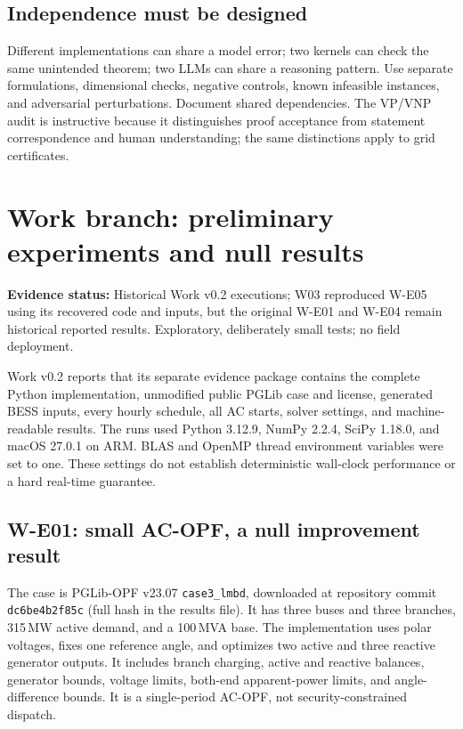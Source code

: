 \documentclass[11pt,letterpaper]{article}
\newcommand{\status}[1]{\textbf{Evidence status:} #1}
\begin{document}
\subsection{Independence must be designed}
Different implementations can share a model error; two kernels can check the same unintended theorem; two LLMs can share a reasoning pattern. Use separate formulations, dimensional checks, negative controls, known infeasible instances, and adversarial perturbations. Document shared dependencies. The VP/VNP audit is instructive because it distinguishes proof acceptance from statement correspondence and human understanding; the same distinctions apply to grid certificates.

\section{Work branch: preliminary experiments and null results}
\label{sec:results}
\status{Historical Work v0.2 executions; W03 reproduced W-E05 using its recovered code and inputs, but the original W-E01 and W-E04 remain historical reported results. Exploratory, deliberately small tests; no field deployment.}\cite{workbranch}

Work v0.2 reports that its separate evidence package contains the complete Python implementation, unmodified public PGLib case and license, generated BESS inputs, every hourly schedule, all AC starts, solver settings, and machine-readable results. The runs used Python 3.12.9, NumPy 2.2.4, SciPy 1.18.0, and macOS 27.0.1 on ARM. BLAS and OpenMP thread environment variables were set to one. These settings do not establish deterministic wall-clock performance or a hard real-time guarantee.

\subsection{W-E01: small AC-OPF, a null improvement result}
The case is PGLib-OPF v23.07 \texttt{case3\_lmbd}, downloaded at repository commit
\texttt{dc6be4b2f85c} (full hash in the results file). It has three buses and three branches, 315\,MW active demand, and a 100\,MVA base. The implementation uses polar voltages, fixes one reference angle, and optimizes two active and three reactive generator outputs. It includes branch charging, active and reactive balances, generator bounds, voltage limits, both-end apparent-power limits, and angle-difference bounds. It is a single-period AC-OPF, not security-constrained dispatch.
\end{document}
